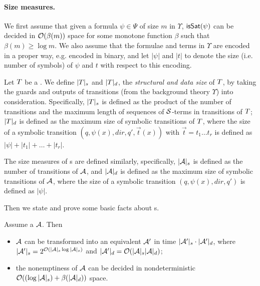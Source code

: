 \paragraph{Size measures.}
We first assume that given a formula $\psi \in \Psi$ of size $m$ in $\Upsilon$, $\mathsf{isSat}(\psi)$ can be decided in $\mathcal{O}(\beta(m))$ space for some monotone function $\beta$ such that $\beta(m) \ge \log m$. We also assume that the formulae and terms in $\Upsilon$ are encoded in a proper way, e.g. encoded in binary,  and let $|\psi|$  and $|t|$ to denote the size (i.e. number of symbols) of $\psi$ and $t$ with respect to this encoding.

Let $T$ be a \SSPT{}. We define $|T|_s$ and $|T|_d$, the \emph{structural and data size} of $T$, by taking the guards and outputs of transitions (from the background theory $\Upsilon$) into consideration. Specifically, $|T|_s$ is defined as the product of the number of transitions and the maximum length of sequences of $\mathcal{S}$-terms in  transitions of $T$; 
$|T|_d$ is defined as the maximum size of symbolic transitions of $T$, where the size of a symbolic transition $(q, \psi(x), dir, q', \vec{t}(x))$ with $\vec{t}=t_1 \ldots t_r$ is defined as $|\psi| + |t_1| + \ldots + |t_r|$.

The size measures of \SSA{}s are defined similarly, specifically, $|\mathcal{A}|_s$  is  defined as the number of transitions of $\mathcal{A}$, and $|\mathcal{A}|_d$ is defined as the maximum size of symbolic transitions of $\mathcal{A}$, where the size of a symbolic transition $(q, \psi(x), dir, q')$ is defined as $|\psi|$. 

Then we state and prove some basic facts about \SSA{}s.
\begin{proposition}\label{prop-2nsa}
Assume a \SSA{}  $\mathcal{A}$. Then
\begin{itemize}
\item $\mathcal{A}$ can be  transformed into an equivalent \SA{} $\mathcal{A}'$ in time $|\mathcal{A}'|_s \cdot |\mathcal{A}'|_d$, where $|\mathcal{A}'|_s = 2^{\mathcal{O}\left(|\mathcal{A}|_s \log |\mathcal{A}|_s\right)}$ and $|\mathcal{A}'|_d = \mathcal{O}(|\mathcal{A}|_s |\mathcal{A}|_d)$;
%
%
%
\item the nonemptiness of $\mathcal{A}$ can be decided in nondeterministic $\mathcal{O}( (\log |\mathcal{A}|_s) + \beta(|\mathcal{A}|_d))$ space.
\end{itemize}
\end{proposition}



